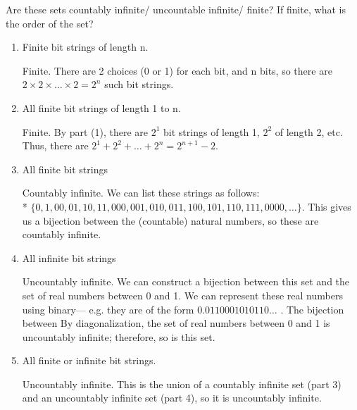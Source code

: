 \question Are these sets countably infinite/ uncountable infinite/ 
finite? If finite, what is the order of the set?
\begin{enumerate}[label=(\alph*)]
\item
Finite bit strings of length n.
\begin{solution}
Finite. There are 2 choices (0 or 1) for each bit, and n bits, so 
there are $2 \times 2 \times \ldots \times 2 = 2^n$ such bit strings.
\end{solution}
\item
All finite bit strings of length 1 to n.
\begin{solution}
Finite. By part (1), there are $2^1$ bit strings of length 1, $2^2$ of 
length 2, etc. Thus, there are $2^1 + 2^2 + \ldots + 2^n = 2^{n + 1}- 2$.
\end{solution}
\item
All finite bit strings
\begin{solution}
Countably infinite. We can list these strings as follows: \\*
$\{0, 1, 00, 01, 10, 11, 000, 001, 010, 011, 100, 101, 110, 111, 0000, \ldots\}$. 
This gives us a bijection between the (countable) natural numbers, so 
these are countably infinite.
\end{solution}
\item
All infinite bit strings
\begin{solution}
Uncountably infinite. We can construct a bijection between this set 
and the set of real numbers between 0 and 1. We can represent these 
real numbers using binary— e.g. they are of the form $0.0110001010110\dots $
. The bijection between 
By diagonalization, the set of real numbers between 0 and 1 is 
uncountably infinite; therefore, so is this set.
\end{solution}
\item
All finite or infinite bit strings.
\begin{solution}
Uncountably infinite. This is the union of a countably infinite set 
(part 3) and an uncountably infinite set (part 4), so it is uncountably 
infinite.
\end{solution}
\end{enumerate}